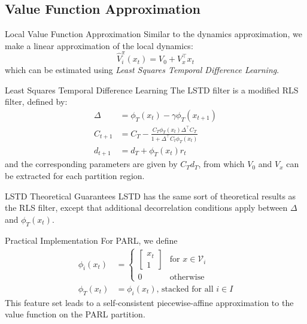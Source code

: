 \documentclass{beamer}
\begin{document}
\subsection{Value Function Approximation}

\begin{frame}{Local Value Function Approximation}
  Similar to the dynamics approximation, we make a linear approximation of the local dynamics:
  \begin{equation}
    \hat{V}^{\pi}_i(x_t) = V_0 + V_x^\top x_t
  \end{equation}
  which can be estimated using \emph{Least Squares Temporal Difference Learning}.
\end{frame}

\begin{frame}{Least Squares Temporal Difference Learning}
  The LSTD filter is a modified RLS filter, defined by:
  \begin{align*}
    \Delta &= \phi_T(x_t) - \gamma \phi_T(x_{t+1})\\
    C_{t+1} &= C_T - \frac{C_T \phi_T(x_t) \Delta^\top C_T}{1 + \Delta^\top C_t \phi_T(x_t)}\\
    d_{t+1} &= d_T + \phi_T(x_t)r_t
  \end{align*}
  and the corresponding parameters are given by $C_T d_T$, from which $V_0$ and $V_x$ can be extracted for each partition region.
\end{frame}

\begin{frame}{LSTD Theoretical Guarantees}
  LSTD has the same sort of theoretical results as the RLS filter, except that
  additional decorrelation conditions apply between $\Delta$ and $\phi_T(x_t)$.
\end{frame}

\begin{frame}{Practical Implementation}
  For PARL, we define
  \begin{align*}
    \phi_i(x_t) &= \begin{cases} \begin{bmatrix} x_t \\ 1 \end{bmatrix} & \text{for } x \in \mathcal{V}_i \\ 0  &\text{otherwise}\end{cases} \\
    \phi_T(x_t) &= \phi_i(x_t) \text{, stacked for all $i \in I$}
  \end{align*}
  This feature set leads to a self-consistent piecewise-affine approximation to
  the value function on the PARL partition.
\end{frame}
\end{document}
